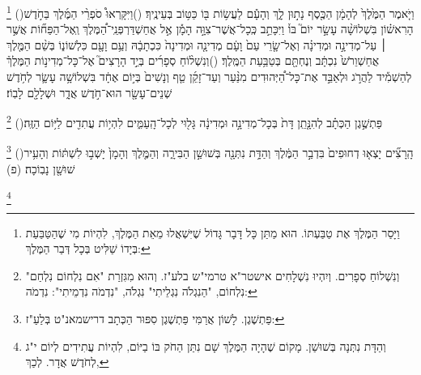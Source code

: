 \documentclass[12pt, openany]{book}
\newcommand{\footnotecomment}[1]{
	\renewcommand\thefootnote{}
	\footnote{#1}}
\newcommand{\commenta}[1]{\footnotecomment{#1}\hspace{0em}}
\newcommand{\vsnum}[1]{(\hebrewnumeral{#1})\space}
\begin{document}
{\commenta{וַיָּסַר הַמֶּלֶךְ אֶת טַבַּעְתּוֹ. הוּא מַתַּן כָּל דָּבָר גָּדוֹל שֶׁיִּשְׁאֲלוּ מֵאֵת הַמֶּלֶךְ, לִהְיוֹת מִי שֶׁהַטַּבַּעַת בְּיָדוֹ שַׁלִּיט בְּכָל דְּבַר הַמֶּלֶךְ: }%
\vsnum{11}וַיֹּ֤אמֶר הַמֶּ֙לֶךְ֙ לְהָמָ֔ן הַכֶּ֖סֶף נָת֣וּן לָ֑ךְ וְהָעָ֕ם לַעֲשׂ֥וֹת בּ֖וֹ כַּטּ֥וֹב בְּעֵינֶֽיךָ׃
\vsnum{12}וַיִּקָּרְאוּ֩ סֹפְרֵ֨י הַמֶּ֜לֶךְ בַּחֹ֣דֶשׁ הָרִאשׁ֗וֹן בִּשְׁלוֹשָׁ֨ה עָשָׂ֣ר יוֹם֮ בּוֹ֒ וַיִּכָּתֵ֣ב כְּֽכָל־אֲשֶׁר־צִוָּ֣ה הָמָ֡ן אֶ֣ל אֲחַשְׁדַּרְפְּנֵֽי־הַ֠מֶּלֶךְ וְֽאֶל־הַפַּח֞וֹת אֲשֶׁ֣ר ׀ עַל־מְדִינָ֣ה וּמְדִינָ֗ה וְאֶל־שָׂ֤רֵי עַם֙ וָעָ֔ם מְדִינָ֤ה וּמְדִינָה֙ כִּכְתָבָ֔הּ וְעַ֥ם וָעָ֖ם כִּלְשׁוֹנ֑וֹ בְּשֵׁ֨ם הַמֶּ֤לֶךְ אֲחַשְׁוֵרֹשׁ֙ נִכְתָּ֔ב וְנֶחְתָּ֖ם בְּטַבַּ֥עַת הַמֶּֽלֶךְ׃
\vsnum{13}וְנִשְׁל֨וֹחַ סְפָרִ֜ים בְּיַ֣ד הָרָצִים֮ אֶל־כָּל־מְדִינ֣וֹת הַמֶּלֶךְ֒ לְהַשְׁמִ֡יד לַהֲרֹ֣ג וּלְאַבֵּ֣ד אֶת־כָּל־הַ֠יְּהוּדִים מִנַּ֨עַר וְעַד־זָקֵ֜ן טַ֤ף וְנָשִׁים֙ בְּי֣וֹם אֶחָ֔ד בִּשְׁלוֹשָׁ֥ה עָשָׂ֛ר לְחֹ֥דֶשׁ שְׁנֵים־עָשָׂ֖ר הוּא־חֹ֣דֶשׁ אֲדָ֑ר וּשְׁלָלָ֖ם לָבֽוֹז׃%
\commenta{וְנִשְׁלוֹחַ סְפָרִים. וְיִהְיוּ נִשְׁלָחִים אישטר"א טרמי"ש בלע"ז. וְהוּא מִגִּזְרַת "אִם נִלְחוֹם נִלְחַם" נִלְחוֹם, "הַנִגְלֹה נִגְלֵיתִי" נִגְלֹה, "נִדְמֹה נִדְמֵיתִי": נִדְמֹה: }%
\vsnum{14}פַּתְשֶׁ֣גֶן הַכְּתָ֗ב לְהִנָּ֤תֵֽן דָּת֙ בְּכָל־מְדִינָ֣ה וּמְדִינָ֔ה גָּל֖וּי לְכָל־הָֽעַמִּ֑ים לִהְי֥וֹת עֲתִדִ֖ים לַיּ֥וֹם הַזֶּֽה׃%
\commenta{פַּתְשֶׁגֶן. לָשׁוֹן אֲרַמִּי פַּתְשֶׁגֶן סִפּוּר הַכְּתָב דרישמאנ"ט בְּלַעַ"ז: }%
\vsnum{15}הָֽרָצִ֞ים יָצְא֤וּ דְחוּפִים֙ בִּדְבַ֣ר הַמֶּ֔לֶךְ וְהַדָּ֥ת נִתְּנָ֖ה בְּשׁוּשַׁ֣ן הַבִּירָ֑ה וְהַמֶּ֤לֶךְ וְהָמָן֙ יָשְׁב֣וּ לִשְׁתּ֔וֹת וְהָעִ֥יר שׁוּשָׁ֖ן נָבֽוֹכָה׃ (פ)%
\commenta{וְהַדָּת נִתְּנָה בְּשׁוּשַׁן. מָקוֹם שֶׁהָיָה הַמֶּלֶךְ שָׁם נִתַּן הַחֹק בּוֹ בַיּוֹם, לִהְיוֹת עֲתִידִים לְיוֹם י"ג לְחֹדֶשׁ אֲדָר. לְכַךְ, }%
\clearpage}
\end{document}
